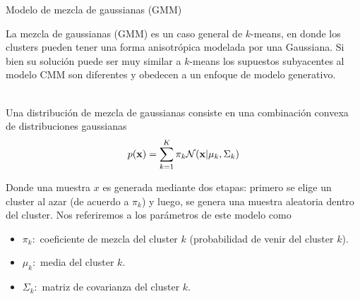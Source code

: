 \documentclass[9pt]{beamer}
\begin{document}
\begin{frame}{Modelo de mezcla de gaussianas (GMM)}

La mezcla de gaussianas (GMM) es un caso general de $k$-means, en donde los clusters pueden tener una forma anisotrópica modelada por una Gaussiana. Si bien su solución puede ser muy similar a $k$-means los supuestos subyacentes al modelo CMM son diferentes y obedecen a un enfoque de modelo generativo. \\~\ \pause

Una distribución de mezcla de gaussianas consiste en una combinación convexa de distribuciones gaussianas
\begin{equation*}
	p(\mathbf{x}) = \sum_{k=1}^K \pi_k \mathcal{N}(\mathbf{x}| \mu_k,\Sigma_k)
\end{equation*}

Donde una muestra $x$ es generada mediante dos etapas: primero se elige un cluster al azar (de acuerdo a $\pi_k$) y luego, se genera una muestra aleatoria dentro del cluster. \pause Nos referiremos a los parámetros de este modelo como 

\begin{itemize}
	\item $\pi_k:$ coeficiente de mezcla del cluster  $k$ (probabilidad de venir del cluster $k$).
	\item $\mu_k:$ media del cluster  $k$.
	\item $\Sigma_k:$ matriz de covarianza del cluster  $k$.
\end{itemize}

\end{frame}
\end{document}
